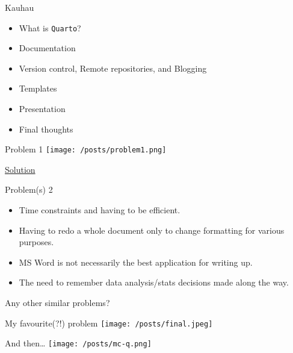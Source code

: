 \documentclass[
  ignorenonframetext,
  aspectratio=169,
]{beamer}
\providecommand{\tightlist}{%
  \setlength{\itemsep}{0pt}\setlength{\parskip}{0pt}}\usepackage{longtable,booktabs,array}
\begin{document}
\begin{frame}[fragile]{Kauhau}
\label{kauhau}
\begin{itemize}[<+->]
\tightlist
\item
  What is \texttt{Quarto}?
\item
  Documentation
\item
  Version control, Remote repositories, and Blogging
\item
  Templates
\item
  Presentation
\item
  Final thoughts
\end{itemize}

\begin{block}{Problem 1}
\label{problem-1}
\texttt{[image: /posts/problem1.png]}

\href{https://github.com/usman-afzali/think-no-think/blob/main/TNT-processing-code.py}{Solution}
\end{block}

\begin{block}{Problem(s) 2}
\label{problems-2}
\begin{itemize}
\tightlist
\item
  Time constraints and having to be efficient.
\item
  Having to redo a whole document only to change formatting for various
  purposes.
\item
  MS Word is not necessarily the best application for writing up.
\item
  The need to remember data analysis/stats decisions made along the way.
\end{itemize}

\begin{tcolorbox}[enhanced jigsaw, bottomrule=.15mm, breakable, colbacktitle=quarto-callout-important-color!10!white, left=2mm, toptitle=1mm, rightrule=.15mm, colback=white, coltitle=black, titlerule=0mm, title=\textcolor{quarto-callout-important-color}{\faExclamation}\hspace{0.5em}{What about the audience?}, opacityback=0, opacitybacktitle=0.6, colframe=quarto-callout-important-color-frame, toprule=.15mm, bottomtitle=1mm, arc=.35mm, leftrule=.75mm]

Any other similar problems?

\end{tcolorbox}
\end{block}

\begin{block}{My favourite(?!) problem}
\label{my-favourite-problem}
\texttt{[image: /posts/final.jpeg]}
\end{block}

\begin{block}{And then\ldots{}}
\label{and-then}
\texttt{[image: /posts/mc-q.png]}
\end{block}
\end{frame}
\end{document}
